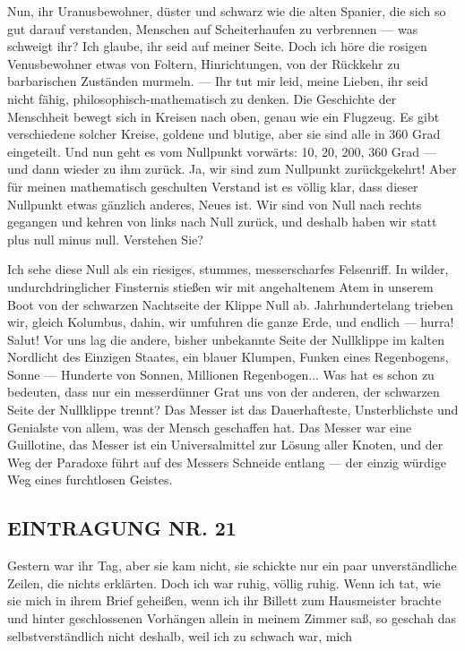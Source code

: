 Nun, ihr Uranusbewohner, düster und schwarz wie die alten Spanier,
die sich so gut darauf verstanden, Menschen auf Scheiterhaufen zu
verbrennen — was schweigt ihr? Ich glaube, ihr seid auf meiner
Seite. Doch ich höre die rosigen Venusbewohner etwas von Foltern,
Hinrichtungen, von der Rückkehr zu barbarischen Zuständen murmeln.
— Ihr tut mir leid, meine Lieben, ihr seid nicht fähig,
philosophisch-mathematisch zu denken. Die Geschichte der Menschheit
bewegt sich in Kreisen nach oben, genau wie ein Flugzeug. Es gibt
verschiedene solcher Kreise, goldene und blutige, aber sie sind
alle in 360 Grad eingeteilt. Und nun geht es vom Nullpunkt
vorwärts: 10, 20, 200, 360 Grad — und dann wieder zu ihm zurück.
Ja, wir sind zum Nullpunkt zurückgekehrt! Aber für meinen
mathematisch geschulten Verstand ist es völlig klar, dass dieser
Nullpunkt etwas gänzlich anderes, Neues ist. Wir sind von Null nach
rechts gegangen und kehren von links nach Null zurück, und deshalb
haben wir statt plus null minus null. Verstehen Sie?

Ich sehe diese Null als ein riesiges, stummes, messerscharfes
Felsenriff. In wilder, undurchdringlicher Finsternis stießen wir
mit angehaltenem Atem in unserem Boot von der schwarzen Nachtseite
der Klippe Null ab. Jahrhundertelang trieben wir, gleich Kolumbus,
dahin, wir umfuhren die ganze Erde, und endlich — hurra! Salut! Vor
uns lag die andere, bisher unbekannte Seite der Nullklippe im
kalten Nordlicht des Einzigen Staates, ein blauer Klumpen, Funken
eines Regenbogens, Sonne — Hunderte von Sonnen, Millionen
Regenbogen... Was hat es schon zu bedeuten, dass nur ein
messerdünner Grat uns von der anderen, der schwarzen Seite der
Nullklippe trennt? Das Messer ist das Dauerhafteste, Unsterblichste
und Genialste von allem, was der Mensch geschaffen hat. Das Messer
war eine Guillotine, das Messer ist ein Universalmittel zur Lösung
aller Knoten, und der Weg der Paradoxe führt auf des Messers
Schneide entlang — der einzig würdige Weg eines furchtlosen
Geistes.

\subsection{EINTRAGUNG NR. 21}

Gestern war ihr Tag, aber sie kam nicht, sie schickte nur ein paar
unverständliche Zeilen, die nichts erklärten. Doch ich war ruhig,
völlig ruhig. Wenn ich tat, wie sie mich in ihrem Brief geheißen,
wenn ich ihr Billett zum Hausmeister brachte und hinter
geschlossenen Vorhängen allein in meinem Zimmer saß, so geschah das
selbstverständlich nicht deshalb, weil ich zu schwach war, mich

